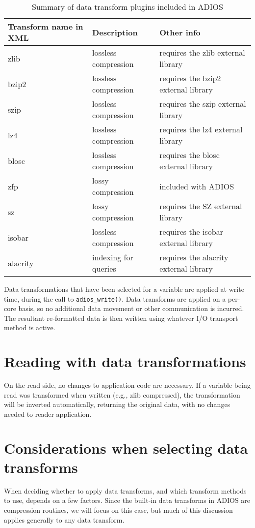 \begin{table}%
\center
\begin{tabular}{l|l|l}
\textbf{Transform name in XML} & \textbf{Description} & \textbf{Other info} \\
\hline
zlib & lossless compression & requires the zlib external library \\
\hline
bzip2 & lossless compression & requires the bzip2 external library \\
\hline
szip & lossless compression & requires the szip external library \\
\hline
lz4 & lossless compression & requires the lz4 external library \\
\hline
blosc & lossless compression & requires the blosc external library \\
\hline
zfp & lossy compression & included with ADIOS \\
\hline
sz & lossy compression & requires the SZ external library \\
\hline
isobar & lossless compression & requires the isobar external library \\
\hline
alacrity & indexing for queries & requires the alacrity external library \\
\end{tabular}
\caption{Summary of data transform plugins included in ADIOS}
\label{tbl:data-transforms-summary}
\end{table}

Data transformations that have been selected for a variable are applied at write time, during the call to \verb+adios_write()+.
Data transforms are applied on a per-core basis, so no additional data movement or other communication is incurred.
The resultant re-formatted data is then written using whatever I/O transport method is active.

\section{Reading with data transformations}
On the read side, no changes to application code are necessary. If a variable being read was transformed when written
(e.g., zlib compressed), the transformation will be inverted automatically, returning the original data,
with no changes needed to reader application.

\section{Considerations when selecting data transforms}
When deciding whether to apply data transforms, and which transform methods to use, depends on a few factors.
Since the built-in data transforms in ADIOS are compression routines, we will focus on this case, but much of
this discussion applies generally to any data transform.

